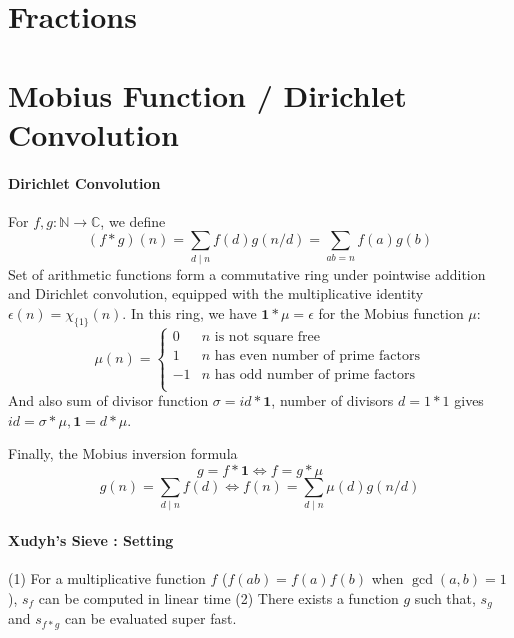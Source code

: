 \section{Fractions}


\section{Mobius Function / Dirichlet Convolution}
\paragraph{Dirichlet Convolution}
For $f, g : \mathbb{N} \to \mathbb{C}$, we define 
$$(f * g)(n) = \sum_{d \mid n} f(d) g(n / d) = \sum_{ab = n} f(a)g(b)$$  
Set of arithmetic functions form a commutative ring under pointwise addition and Dirichlet convolution, equipped with the multiplicative identity $\epsilon(n) = \chi_{\{1\}}(n)$. In this ring, we have $\mathbf{1} * \mu = \epsilon$ for the Mobius function $\mu$:
$$
	\mu(n) = \begin{cases} 0 & n \textrm{ is not square free}\\ 1 & n \textrm{ has even number of prime factors}\\ -1 & n \textrm{ has odd number of prime factors}\\\end{cases}
$$
And also sum of divisor function $\sigma = id * \mathbf{1}$, number of divisors $d = 1 * 1$ gives $id = \sigma * \mu, \mathbf{1} = d * \mu$. 

Finally, the Mobius inversion formula 
$$g = f * \mathbf{1} \iff f = g * \mu$$
$$g(n) = \sum_{d \mid n} f(d) \iff f(n) = \sum_{d \mid n} \mu(d)g(n/d)$$
\paragraph{Xudyh's Sieve : Setting}
(1) For a multiplicative function $f$ ($f(ab) = f(a)f(b)$ when $\gcd(a, b) = 1$), $s_f$ can be computed in linear time
(2) There exists a function $g$ such that, $s_g$ and $s_{f * g}$ can be evaluated super fast. 

